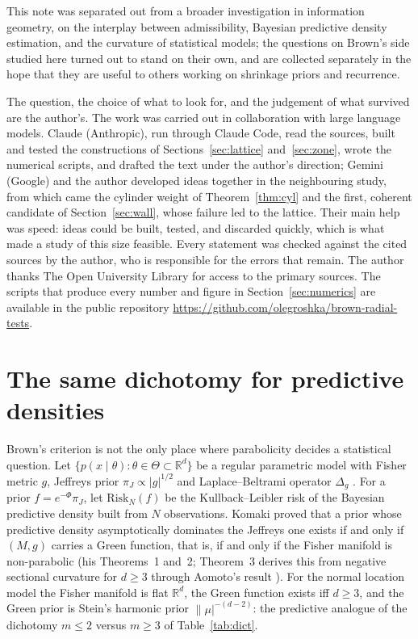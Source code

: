 \documentclass[11pt]{amsart}
\newcommand{\R}{\mathbb{R}}
\newcommand{\abs}[1]{\lvert #1\rvert}
\newcommand{\norm}[1]{\lVert #1\rvert}
\theoremstyle{plain}
\theoremstyle{definition}
\theoremstyle{remark}
\begin{document}
This note was separated out from a broader investigation in information geometry,
on the interplay between admissibility, Bayesian predictive density estimation,
and the curvature of statistical models; the questions on Brown's side studied
here turned out to stand on their own, and are collected separately in the hope
that they are useful to others working on shrinkage priors and recurrence.

The question, the choice of what to look for, and the judgement of what survived
are the author's. The work was carried out in collaboration with large language
models. Claude (Anthropic), run through Claude Code, read the sources, built and
tested the constructions of Sections~\ref{sec:lattice} and~\ref{sec:zone}, wrote
the numerical scripts, and drafted the text under the author's direction; Gemini
(Google) and the author developed ideas together in the neighbouring study, from
which came the cylinder weight of Theorem~\ref{thm:cyl} and the first, coherent
candidate of Section~\ref{sec:wall}, whose failure led to the lattice. Their
main help was speed: ideas could be built, tested, and discarded quickly, which
is what made a study of this size feasible. Every statement was checked against
the cited sources by the author, who is responsible for the errors that remain.
The author thanks The Open University Library for access to the primary sources.
The scripts that produce every number and figure in Section~\ref{sec:numerics}
are available in the public repository
\url{https://github.com/olegroshka/brown-radial-tests}.

\appendix

\section{The same dichotomy for predictive densities}\label{app:komaki}

Brown's criterion is not the only place where parabolicity decides a
statistical question. Let $\{p(x\mid\theta):\theta\in\Theta\subset\R^d\}$ be a
regular parametric model with Fisher metric $g$, Jeffreys prior
$\pi_J\propto\abs g^{1/2}$ and Laplace--Beltrami operator $\Delta_g$
\cite{amari2000}. For a prior $f=e^{-\Phi}\pi_J$, let $\mathrm{Risk}_N(f)$ be
the Kullback--Leibler risk of the Bayesian predictive density built from $N$
observations. Komaki \cite{komaki2006} proved that a prior whose predictive
density asymptotically dominates the Jeffreys one exists if and only if $(M,g)$
carries a Green function, that is, if and only if the Fisher manifold is
non-parabolic (his Theorems~1 and~2; Theorem~3 derives this from negative
sectional curvature for $d\ge3$ through Aomoto's result \cite{aomoto1966}). For
the normal location model the Fisher manifold is flat $\R^d$, the Green
function exists iff $d\ge3$, and the Green prior is Stein's harmonic prior
$\norm\mu^{-(d-2)}$: the predictive analogue of the dichotomy $m\le2$ versus
$m\ge3$ of Table~\ref{tab:dict}.
\end{document}

